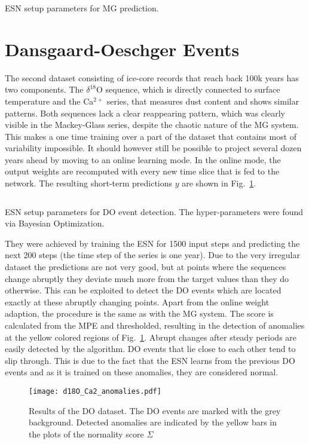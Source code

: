 \begin{listing}
  \inputminted{json}{pseudocode/model_setups/mackey_setup.json}
  \label{lst:mackey_setup}
  \caption{ESN setup parameters for MG prediction.}
\end{listing}






\clearpage
\section{Dansgaard-Oeschger Events}%
\label{sec:res_dansgaard_oeschger_events}

The second dataset consisting of ice-core records that reach back 100k years
has two components. The $\delta^{18}$O sequence, which is directly connected to
surface temperature and the Ca$^{2+}$ series, that measures dust content and
shows similar patterns.  Both sequences lack a clear reappearing pattern, which
was clearly visible in the Mackey-Glass series, despite the chaotic nature of
the MG system. This makes a one time training over a part of the dataset that
contains most of variability impossible.  It should however still be possible
to project several dozen years ahead by moving to an online learning mode. In
the online mode, the output weights are recomputed with every new time slice
that is fed to the network.  The resulting short-term predictions $y$ are shown
in Fig.~\ref{fig:d18O_anomalies}.
\begin{listing}
  \inputminted{json}{pseudocode/model_setups/DO_setup.json}
  \label{lst:DO_setup}
  \caption{ESN setup parameters for DO event detection. The hyper-parameters were
  found via Bayesian Optimization.}
\end{listing}
They were achieved by training the ESN for 1500 input steps and predicting the
next 200 steps (the time step of the series is one year). Due to the very
irregular dataset the predictions are not very good, but at points where the
sequences change abruptly they deviate much more from the target values than
they do otherwise. This can be exploited to detect the DO events which are
located exactly at these abruptly changing points. Apart from the online weight
adaption, the procedure is the same as with the MG system. The score is
calculated from the MPE and thresholded, resulting in the detection of
anomalies at the yellow colored regions of Fig.~\ref{fig:d18O_anomalies}.
Abrupt changes after steady periods are easily detected by the algorithm.  DO
events that lie close to each other tend to slip through. This is due to the
fact that the ESN learns from the previous DO events and as it is trained on
these anomalies, they are considered normal.
\begin{figure}
  \centering
  \texttt{[image: d18O\_Ca2\_anomalies.pdf]}
  \caption{Results of the DO dataset. The DO events are marked with
  the grey background. Detected anomalies are indicated by the yellow bars in
  the plots of the normality score $\Sigma$}
  \label{fig:d18O_anomalies}
\end{figure}




